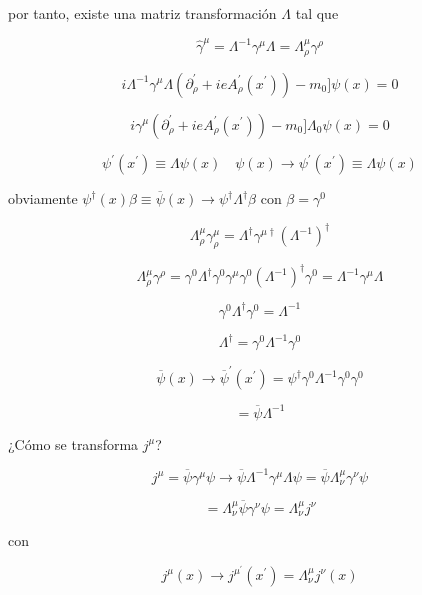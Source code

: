 \documentclass{report}
\begin{document}
por tanto, existe una matriz transformación $\Lambda$ tal que

\begin{equation}
\hat{\gamma}^{\mu} = \Lambda^{-1} \gamma^{\mu} \Lambda = \Lambda_{\rho}^{\mu} \gamma^{\rho}
\end{equation}

\[i \Lambda^{-1} \gamma^{\mu} \Lambda (\partial_{\rho}^{\prime} + ie A_{\rho}^{\prime} (x^{\prime}))-m_0] \psi(x)=0\]

\[i \gamma^{\mu} (\partial_{\rho}^{\prime} + i eA_{\rho}^{\prime} (x^{\prime}))-m_0] \Lambda_{0}\psi (x) = 0 \]

\[\psi^{\prime} (x^{\prime}) \equiv \Lambda \psi (x) \quad \psi (x) \rightarrow \psi ^{\prime} (x^{\prime}) \equiv \Lambda \psi (x)\]

obviamente $\psi^{\dagger} (x) \beta  \equiv \overline{\psi} (x) \rightarrow \psi ^{\dagger} \Lambda^{\dagger} \beta$ con $\beta = \gamma^{0}$

\[\Lambda_{\rho}^{\mu} \gamma_{\rho}^{\mu} = \Lambda^{\dagger} \gamma^{\mu \dagger}(\Lambda^{-1})^{\dagger}\]

\[\Lambda_{\rho}^{\mu} \gamma^{\rho} = \gamma^{0} \Lambda^{\dagger} \gamma^{0} \gamma^{\mu} \gamma^0 (\Lambda^{-1})^{\dagger} \gamma^0 = \Lambda^{-1} \gamma^{\mu} \Lambda\]

\[\gamma^0 \Lambda^{\dagger} \gamma^0 = \Lambda^{-1}\]

\[\Lambda^{\dagger} = \gamma^0 \Lambda^{-1} \gamma^0\]

\[\overline{\psi} (x) \rightarrow \overline{\psi}^{\prime} (x^{\prime}) = \psi ^{\dagger} \gamma^0 \Lambda^{-1} \gamma^0 \gamma^0\]

\begin{equation}
= \overline{\psi} \Lambda^{-1}
\end{equation}

¿Cómo se transforma $j^{\mu}$?

\[j^{\mu} = \overline{\psi} \gamma^{\mu} \psi \rightarrow \overline{\psi} \Lambda^{-1} \gamma^{\mu} \Lambda \psi = \overline{\psi} \Lambda_{\nu} ^{\mu} \gamma^{\nu} \psi\]

\[= \Lambda_{\nu}^{\mu} \overline{\psi} \gamma^{\nu} \psi = \Lambda_{\nu}^{\mu} j^{\nu}\]

con

\begin{equation}
j^{\mu} (x) \rightarrow j^{\mu ^{\prime}} (x^{\prime}) = \Lambda_{\nu}^{\mu} j^{\nu} (x)
\end{equation}
\end{document}
